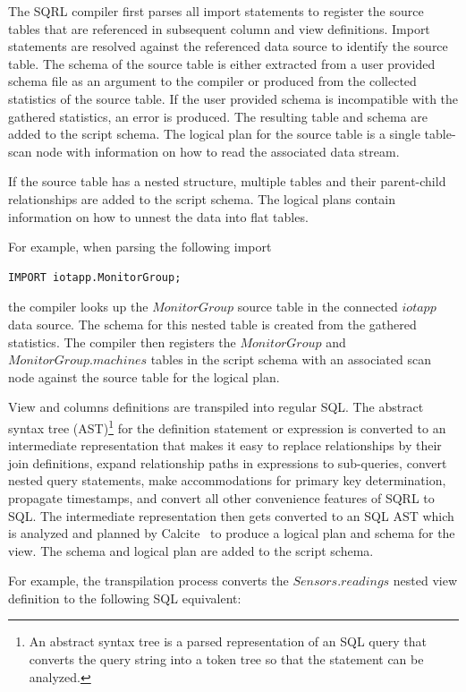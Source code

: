\documentclass[	DIV=calc,%
							paper=letter,%
							fontsize=11pt,%
							twocolumn]{scrartcl}	 					%
\begin{document}
The SQRL compiler first parses all import statements to register the source tables that are referenced in subsequent column and view definitions. Import statements are resolved against the referenced data source to identify the source table. The schema of the source table is either extracted from a user provided schema file as an argument to the compiler or produced from the collected statistics of the source table. If the user provided schema is incompatible with the gathered statistics, an error is produced. The resulting table and schema are added to the script schema. The logical plan for the source table is a single table-scan node with information on how to read the associated data stream.

If the source table has a nested structure, multiple tables and their parent-child relationships are added to the script schema. The logical plans contain information on how to unnest the data into flat tables.

For example, when parsing the following import
\begin{lstlisting}[language=SQL]
IMPORT iotapp.MonitorGroup;
\end{lstlisting}
the compiler looks up the $MonitorGroup$ source table in the connected $iotapp$ data source. The schema for this nested table is created from the gathered statistics. The compiler then registers the $MonitorGroup$ and $MonitorGroup.machines$ tables in the script schema with an associated scan node against the source table for the logical plan.

View and columns definitions are transpiled into regular SQL. The abstract syntax tree (AST)\footnote{An abstract syntax tree is a parsed representation of an SQL query that converts the query string into a token tree so that the statement can be analyzed.} for the definition statement or expression is converted to an intermediate representation that makes it easy to replace relationships by their join definitions, expand relationship paths in expressions to sub-queries, convert nested query statements, make accommodations for primary key determination, propagate timestamps, and convert all other convenience features of SQRL to SQL. The intermediate representation then gets converted to an SQL AST which is analyzed and planned by Calcite~\cite{} to produce a logical plan and schema for the view. The schema and logical plan are added to the script schema.

For example, the transpilation process converts the $Sensors.readings$ nested view definition to the following SQL equivalent:
\end{document}
